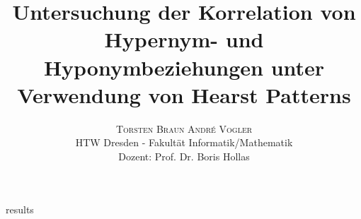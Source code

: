 \documentclass[twoside]{article}
\title{\vspace{-15mm}\fontsize{20pt}{10pt}\selectfont\textbf{Untersuchung der Korrelation von Hypernym- und
  Hyponymbeziehungen unter Verwendung von Hearst Patterns}}
\author{
\large
\textsc{Torsten Braun \qquad Andr\'{e} Vogler}\\[2mm]
\normalsize HTW Dresden - Fakultät Informatik/Mathematik \\
\normalsize Dozent: Prof. Dr. Boris Hollas
\vspace{-5mm}
}
\date{}
\begin{document}
  \maketitle
  \thispagestyle{fancy}

  

  \begin{multicols}{2}
    
    
     {results}

    {}
    
  \end{multicols}
\end{document}
